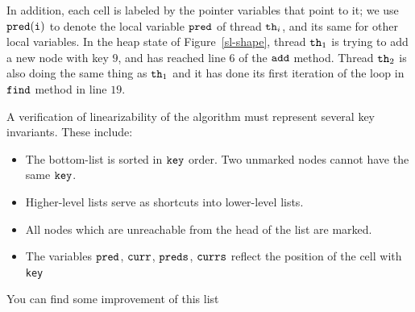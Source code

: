 In addition, each cell is labeled by the
pointer variables that point to it; we use ${\tt pred(i)}$ to denote the local
variable ${\tt pred}$ of thread ${\tt th}_i$, and its same for other local variables.
In the heap state of Figure~\ref{sl-shape}, thread ${\tt th}_1$ is trying to add a new node with key $9$, and has reached line $6$ of the $\tt add$ method.  Thread ${\tt th}_2$ is also doing the same thing as ${\tt th}_1$ and it has done its first iteration of the loop in $\tt find$ method in line $19$.




A verification of linearizability of the algorithm must represent several key
invariants. These include:
\begin{itemize}
\item The bottom-list is sorted in $\tt key$ order. Two unmarked nodes cannot have the same $\tt key$.
\item Higher-level lists serve as shortcuts into lower-level lists.
\item All nodes which are unreachable from the head of the list are marked.
\item The variables $\tt pred$, $\tt curr$, $\tt preds$, $\tt currs$ reflect the position of the
  cell with {\tt key}
\end{itemize}
You can find some improvement of this list


